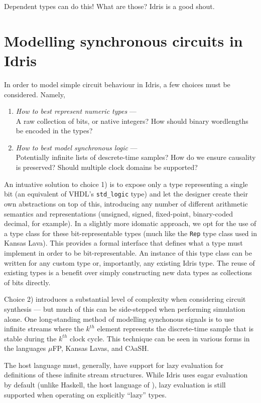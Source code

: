 \documentclass[conference]{IEEEtran}
\begin{document}
Dependent types can do this! What are those? Idris is a good shout.

\section{Modelling synchronous circuits in Idris}

In order to model simple circuit behaviour in Idris, a few choices must be considered. Namely,
\begin{enumerate}
\item \emph{How to best represent numeric types} --- \\A raw collection of bits, or
  native integers? How should binary wordlengths be encoded in the types?
\item \emph{How to best model synchronous logic} --- \\Potentially infinite lists of
  descrete-time samples? How do we ensure causality is preserved? Should
  multiple clock domains be supported?
\end{enumerate}

An intuative solution to choice 1) is to expose only a type representing a
single bit (an equivalent of VHDL's \texttt{std\_logic} type) and let the
designer create their own abstractions on top of this, introducing any number of
different arithmetic semantics and representations (unsigned, signed,
fixed-point, binary-coded decimal, for example). In a slightly more idomatic
approach, we opt for the use of a type class for these bit-representable types
(much like the \texttt{Rep} type class used in Kansas Lava\cite{gill_13}). This
provides a formal interface that defines what a type must implement in order to
be bit-representable. An instance of this type class can be written for any
custom type or, importantly, any existing Idris type. The reuse of existing
types is a benefit over simply constructing new data types as collections of
bits directly.

Choice 2) introduces a substantial level of complexity when considering circuit
synthesis --- but much of this can be side-stepped when performing simulation
alone. One long-standing method of modelling synchonous signals is to use
infinite streams where the $k^{th}$ element represents the discrete-time sample
that is stable during the $k^{th}$ clock cycle. This technique can be seen in
various forms in the languages $\mu$FP\cite{ufp}, Kansas Lavas\cite{gill_09},
and C$\lambda$aSH\cite{baaij_15}.

The host language must, generally, have support for lazy evaluation for
definitions of these infinite stream structures. While Idris uses eagar
evaluation by default (unlike Haskell, the host language of
\cite{gill_09,baaij_15}), lazy evaluation is still supported when operating on
explicitly ``lazy'' types.
\end{document}
